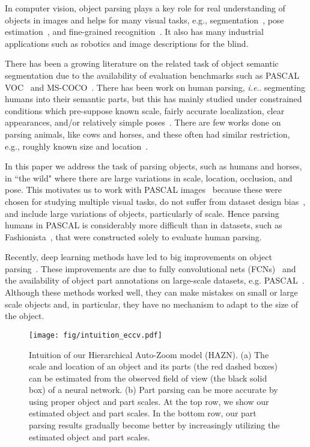 \documentclass[runningheads]{llncs}
\makeatletter
\DeclareRobustCommand\onedot{\futurelet\@let@token\@onedot}
\def\@onedot{\ifx\@let@token.\else.\null\fi\xspace}
\def\ie{\emph{i.e}\onedot} \def\Ie{\emph{I.e}\onedot}
\makeatother
\begin{document}
In computer vision, object parsing plays a key role for real understanding of objects in  images and helps for many visual tasks, e.g., segmentation~\cite{eslami2012generative,wang2015joint},  pose estimation~\cite{dong2014towards}, and fine-grained recognition~\cite{zhang2014part}. It also has many industrial applications such as robotics and image descriptions for the blind.

There has been a growing literature on the related task of object semantic segmentation due to the availability of
evaluation benchmarks such as PASCAL VOC~\cite{everingham2014pascal} and MS-COCO~\cite{lin2014microsoft}. There has been work on human parsing, \ie segmenting humans into their semantic parts, but this has mainly studied under constrained conditions which pre-suppose known scale, fairly accurate localization, clear appearances, and/or relatively simple poses~\cite{bo2011shape,zhu2011max,eslami2012generative,yamaguchi2012parsing,dong2014towards,LiuCVPR15}. There are few works done on parsing animals, like cows and horses, and these often had similar restriction, e.g., roughly known size and location~\cite{wang2014semantic,wang2015joint}.

In this paper we address the task of parsing objects, such as humans and horses, in ``the wild" where there are large variations in scale, location, occlusion, and pose. This motivates us to work with PASCAL images~\cite{everingham2014pascal} because these were chosen for studying multiple visual tasks, do not suffer from dataset design bias~\cite{li2014secrets}, and include large variations of objects, particularly of scale. Hence parsing humans in PASCAL is considerably more difficult than in datasets, such as Fashionista~\cite{yamaguchi2012parsing}, that were constructed solely to evaluate human parsing.

Recently, deep learning methods have led to big improvements on object parsing~\cite{hariharan2014hypercolumns,wang2015joint}. These improvements are due to fully convolutional nets (FCNs)~\cite{long2014fully} and the availability of object part annotations on large-scale datasets, e.g. PASCAL~\cite{chen2014detect}. Although these methods worked well, they can make mistakes on small or large scale objects and, in particular, they have no mechanism to adapt to the size of the object.


\begin{figure}[t!]
\begin{center}
\texttt{[image: fig/intuition\_eccv.pdf]}
\end{center}
\vspace{-1\baselineskip}
\caption{Intuition of our Hierarchical Auto-Zoom model (HAZN). (a) The scale and location of an object and its parts (the red dashed boxes) can be estimated from the observed field of view (the black solid box) of a neural network. (b) Part parsing can be more accurate by using proper object and part scales. 
At the top row, we show our estimated object and part scales. 
In the bottom row, our part parsing results gradually become better by increasingly utilizing the estimated object and part scales.}
\vspace{-1.6\baselineskip}
\label{fig:intuition}
\end{figure}
\end{document}
